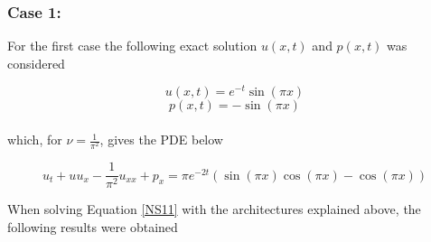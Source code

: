 \documentclass[12pt,letterpaper]{article}
\begin{document}
\subsubsection*{Case 1:}

For the first case the following exact solution $u(x,t)$ and $p(x,t)$ was considered

$$u(x,t) = e^{-t}\sin(\pi x)$$
$$p(x,t) = -\sin(\pi x)$$\\

which, for $\nu=\frac{1}{\pi^2}$, gives the PDE below

\begin{equation}
  \label{NS11}
  u_t + u u_x - \frac{1}{\pi^2}u_{xx} + p_x = \pi e^{-2t}\left(\sin(\pi x)\cos(\pi x) - \cos(\pi x)\right) 
\end{equation}

When solving Equation \ref{NS11} with the architectures explained above, the following results were obtained
\end{document}
